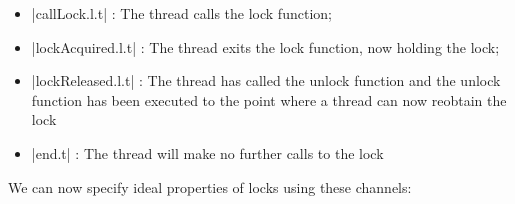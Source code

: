 \begin{itemize}
  \item |callLock.l.t| : The thread calls the lock function;
  \item |lockAcquired.l.t| : The thread exits the lock function, now holding the lock;
  \item |lockReleased.l.t| : The thread has called the unlock function and the unlock function has been executed to the point where a thread can now reobtain the lock
  \item |end.t| : The thread will make no further calls to the lock 
  
\end{itemize}

We can now specify ideal properties of locks using these channels:

